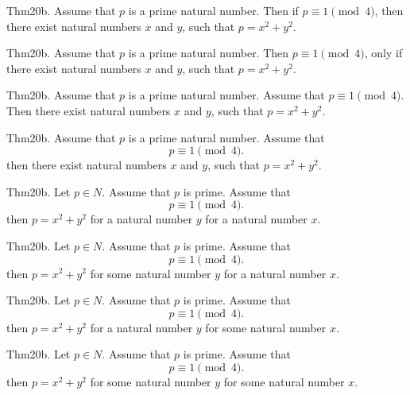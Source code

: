 \documentclass{article}
\begin{document}
Thm20b. Assume that $p$ is a prime natural number. Then if $p \equiv 1 \pmod{ 4}$, then there exist natural numbers $x$ and $y$, such that $p = x ^{ 2}+ y ^{ 2}$.

Thm20b. Assume that $p$ is a prime natural number. Then $p \equiv 1 \pmod{ 4}$, only if there exist natural numbers $x$ and $y$, such that $p = x ^{ 2}+ y ^{ 2}$.

Thm20b. Assume that $p$ is a prime natural number. Assume that $p \equiv 1 \pmod{ 4}$. Then there exist natural numbers $x$ and $y$, such that $p = x ^{ 2}+ y ^{ 2}$.

Thm20b. Assume that $p$ is a prime natural number. Assume that $$p \equiv 1 \pmod{ 4}.$$ then there exist natural numbers $x$ and $y$, such that $p = x ^{ 2}+ y ^{ 2}$.

Thm20b. Let $p \in N$. Assume that $p$ is prime. Assume that $$p \equiv 1 \pmod{ 4}.$$ then $p = x ^{ 2}+ y ^{ 2}$ for a natural number $y$ for a natural number $x$.

Thm20b. Let $p \in N$. Assume that $p$ is prime. Assume that $$p \equiv 1 \pmod{ 4}.$$ then $p = x ^{ 2}+ y ^{ 2}$ for some natural number $y$ for a natural number $x$.

Thm20b. Let $p \in N$. Assume that $p$ is prime. Assume that $$p \equiv 1 \pmod{ 4}.$$ then $p = x ^{ 2}+ y ^{ 2}$ for a natural number $y$ for some natural number $x$.

Thm20b. Let $p \in N$. Assume that $p$ is prime. Assume that $$p \equiv 1 \pmod{ 4}.$$ then $p = x ^{ 2}+ y ^{ 2}$ for some natural number $y$ for some natural number $x$.
\end{document}
